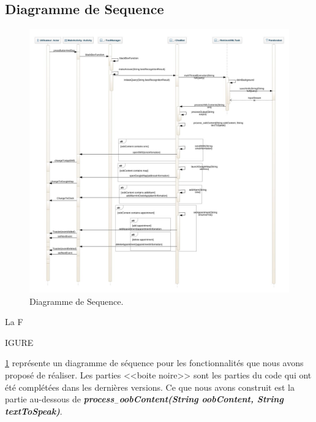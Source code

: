 \subsection{Diagramme de Sequence}
\begin{figure}[ht]
\centering
\includegraphics[scale=0.4]{./diagrammes/SequenceDiagram.jpeg}
\caption{Diagramme de Sequence.\label{fig3}}
\end{figure}
\indent La F\begin{footnotesize}IGURE\end{footnotesize} \ref{fig3} représente un diagramme de séquence pour les fonctionnalités que nous avons proposé de réaliser. Les parties <<boite noire>> sont les parties du code qui ont été complétées dans les dernières versions. Ce que nous avons construit est la partie au-dessous de \textbf{\emph{process$_-$oobContent(String oobContent, String textToSpeak)}}.
\newpage

